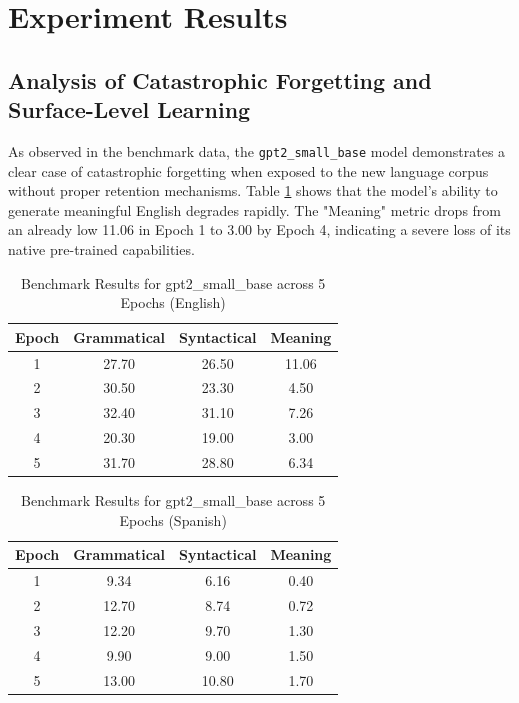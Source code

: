 \section{Experiment Results}
\label{sec:experiment_results}

\subsection{Analysis of Catastrophic Forgetting and Surface-Level Learning}
As observed in the benchmark data, the \texttt{gpt2\_small\_base} model demonstrates a clear case of catastrophic forgetting when exposed to the new language corpus without proper retention mechanisms. Table \ref{tab:gpt2_small_en} shows that the model's ability to generate meaningful English degrades rapidly. The "Meaning" metric drops from an already low 11.06 in Epoch 1 to 3.00 by Epoch 4, indicating a severe loss of its native pre-trained capabilities. 

\begin{table}[htpb]
\centering
\caption{Benchmark Results for gpt2\_small\_base across 5 Epochs (English)}
\label{tab:gpt2_small_en}
\begin{tabular}{@{}cccc@{}}
\toprule
\textbf{Epoch} & \textbf{Grammatical} & \textbf{Syntactical} & \textbf{Meaning} \\ \midrule
1              & 27.70                & 26.50                & 11.06            \\
2              & 30.50                & 23.30                & 4.50             \\
3              & 32.40                & 31.10                & 7.26             \\
4              & 20.30                & 19.00                & 3.00             \\
5              & 31.70                & 28.80                & 6.34             \\ \bottomrule
\end{tabular}
\end{table}

\begin{table}[htpb]
\centering
\caption{Benchmark Results for gpt2\_small\_base across 5 Epochs (Spanish)}
\label{tab:gpt2_small_es}
\begin{tabular}{@{}cccc@{}}
\toprule
\textbf{Epoch} & \textbf{Grammatical} & \textbf{Syntactical} & \textbf{Meaning} \\ \midrule
1              & 9.34                 & 6.16                 & 0.40             \\
2              & 12.70                & 8.74                 & 0.72             \\
3              & 12.20                & 9.70                 & 1.30             \\
4              & 9.90                 & 9.00                 & 1.50             \\
5              & 13.00                & 10.80                & 1.70             \\ \bottomrule
\end{tabular}
\end{table}

